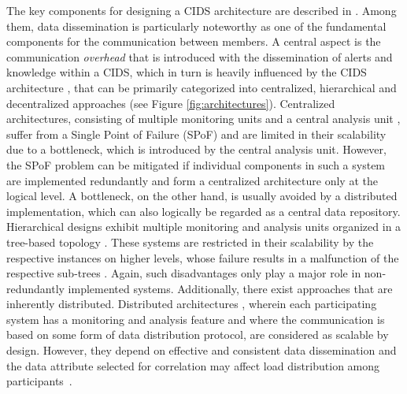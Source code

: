 The key components for designing a CIDS architecture are described in \cite[p. 34]{vasilomanolakis_collaborative_2016}. Among them, data dissemination is particularly noteworthy as one of the fundamental components for the communication between members. A central aspect is the communication \textit{overhead} that is introduced with the dissemination of alerts and knowledge within a CIDS, which in turn is heavily influenced by the CIDS architecture \cite[p.39]{vasilomanolakis_collaborative_2016}, that can be primarily categorized into centralized, hierarchical and decentralized approaches \cite{Zhou2010} (see Figure \ref{fig:architectures}). Centralized architectures, consisting of multiple monitoring units and a central analysis unit \cite{Cuppens2002}\cite{Miller2003}, suffer from a Single Point of Failure (SPoF) and are limited in their scalability due to a bottleneck, which is introduced by the central analysis unit. However, the SPoF problem can be mitigated if individual components in such a system are implemented redundantly and form a centralized architecture only at the logical level. A bottleneck, on the other hand, is usually avoided by a distributed implementation, which can also logically be regarded as a central data repository. Hierarchical designs exhibit multiple monitoring and analysis units organized in a tree-based topology \cite{Phillip1997,Zhang2001,Nguyen2019}. These systems are restricted in their scalability by the respective instances on higher levels, whose failure results in a malfunction of the respective sub-trees \cite{Zhou2010}. Again, such disadvantages only play a major role in non-redundantly implemented systems. Additionally, there exist approaches that are inherently distributed. Distributed architectures \cite{Vasilomanolakis2015SkipMon,Perez2013,Bye2008,Fung2008,Janakiraman2003}, wherein each participating system has a monitoring and analysis feature and where the communication is based on some form of data distribution protocol, are considered as scalable by design. However, they depend on effective and consistent data dissemination and the data attribute selected for correlation may affect load distribution among participants~\cite{Zhou2010}.


